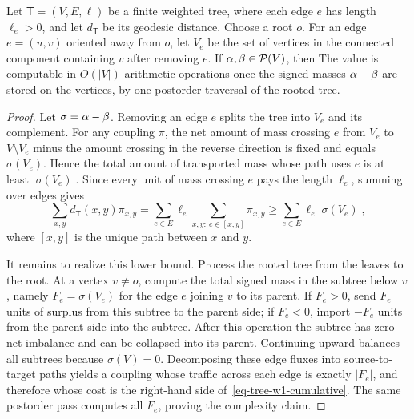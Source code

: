 \begin{prop}\label{prop-tree-w1-cumulative}
	Let $\mathsf{T}=(V,E,\ell)$ be a finite weighted tree, where each edge $e$ has length $\ell_e>0$, and let $d_{\mathsf{T}}$ be its geodesic distance. Choose a root $o$. For an edge $e=(u,v)$ oriented away from $o$, let $V_e$ be the set of vertices in the connected component containing $v$ after removing $e$. If $\alpha,\beta\in\mathcal{P}(V)$, then
	The value is computable in $O(|V|)$ arithmetic operations once the signed masses $\alpha-\beta$ are stored on the vertices, by one postorder traversal of the rooted tree.
\end{prop}
\begin{proof}
	Let $\sigma=\alpha-\beta$. Removing an edge $e$ splits the tree into $V_e$ and its complement. For any coupling $\pi$, the net amount of mass crossing $e$ from $V_e$ to $V\setminus V_e$ minus the amount crossing in the reverse direction is fixed and equals $\sigma(V_e)$. Hence the total amount of transported mass whose path uses $e$ is at least $|\sigma(V_e)|$. Since every unit of mass crossing $e$ pays the length $\ell_e$, summing over edges gives
	\[
		\sum_{x,y}d_{\mathsf{T}}(x,y)\pi_{x,y}
		=
		\sum_{e\in E}\ell_e
		\sum_{x,y:\ e\in[x,y]}\pi_{x,y}
		\geq
		\sum_{e\in E}\ell_e|\sigma(V_e)|,
	\]
	where $[x,y]$ is the unique path between $x$ and $y$.

	It remains to realize this lower bound. Process the rooted tree from the leaves to the root. At a vertex $v\neq o$, compute the total signed mass in the subtree below $v$, namely $F_e=\sigma(V_e)$ for the edge $e$ joining $v$ to its parent. If $F_e>0$, send $F_e$ units of surplus from this subtree to the parent side; if $F_e<0$, import $-F_e$ units from the parent side into the subtree. After this operation the subtree has zero net imbalance and can be collapsed into its parent. Continuing upward balances all subtrees because $\sigma(V)=0$. Decomposing these edge fluxes into source-to-target paths yields a coupling whose traffic across each edge is exactly $|F_e|$, and therefore whose cost is the right-hand side of~\eqref{eq-tree-w1-cumulative}. The same postorder pass computes all $F_e$, proving the complexity claim.
\end{proof}

